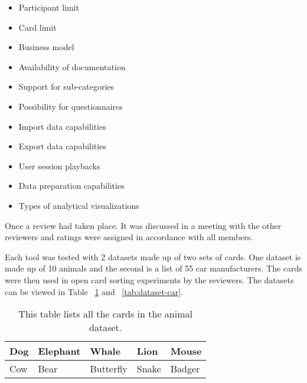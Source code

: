 \begin{itemize}
    \item Participant limit
    \item Card limit
    \item Business model
    \item Availability of documentation
    \item Support for sub-categories
    \item Possibility for questionnaires
    \item Import data capabilities
    \item Export data capabilities
    \item User session playbacks
    \item Data preparation capabilities
    \item Types of analytical visualizations
\end{itemize}

Once a review had taken place. It was discussed
in a meeting with the other reviewers and ratings were assigned in
accordance with all members.

Each tool was tested with 2 datasets made up of two sets of cards. One
dataset is made up of 10 animals and the second is a list of 55 car
manufacturers. The cards were then used in open card sorting
experiments by the reviewers. The datasets can be viewed in Table
~\ref{tab:dataset-animal} and ~\ref{tab:dataset-car}.

\begin{table}[tp]
\centering
\begin{tabularx}
{\linewidth}{|X|X|X|X|X|}
\hline
Dog& Elephant  & Whale     & Lion& Mouse         \\
\hline
Cow       & Bear& Butterfly & Snake  & Badger    \\
\hline
\end{tabularx} 
\caption[Animal Dataset] 
{ 
This table lists all the cards in the animal dataset.
}
\label{tab:dataset-animal}
\end{table}

